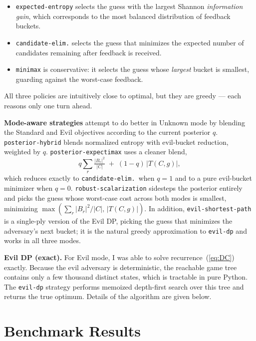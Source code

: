 \documentclass[11pt]{article}
\newcommand{\evilT}{T}
\begin{document}
\begin{itemize}
\item \texttt{expected-entropy} selects the guess with the largest
Shannon \emph{information gain}, which corresponds to the most
balanced distribution of feedback buckets.
\item \texttt{candidate-elim.} selects the guess that minimizes the
expected number of candidates remaining after feedback is received.
\item \texttt{minimax} is conservative: it selects the guess whose
\emph{largest} bucket is smallest, guarding against the worst-case
feedback.
\end{itemize}

All three policies are intuitively close to optimal, but they are
greedy --- each reasons only one turn ahead.

\textbf{Mode-aware strategies} attempt to do better in Unknown mode by
blending the Standard and Evil objectives according to the current
posterior $q$. \texttt{posterior-hybrid} blends normalized entropy
with evil-bucket reduction, weighted by $q$.
\texttt{posterior-expectimax} uses a cleaner blend,
\[
  q\sum_r \tfrac{|B_r|^2}{|C|} \;+\; (1-q)\,|\evilT(C, g)|,
\]
which reduces exactly to \texttt{candidate-elim.}\ when $q = 1$ and to
a pure evil-bucket minimizer when $q = 0$.
\texttt{robust-scalarization} sidesteps the posterior entirely and
picks the guess whose worst-case cost across both modes is smallest,
minimizing $\max(\sum_r |B_r|^2 / |C|, \,|\evilT(C, g)|)$. In addition,
\texttt{evil-shortest-path} is a single-ply version of the Evil DP,
picking the guess that minimizes the adversary's next bucket; it is
the natural greedy approximation to \texttt{evil-dp} and works in all
three modes.

\textbf{Evil DP (exact).} For Evil mode, I was able to solve
recurrence~(\ref{eq:DC}) exactly. Because the evil adversary is
deterministic, the reachable game tree contains only a few thousand
distinct states, which is tractable in pure Python. The
\texttt{evil-dp} strategy performs memoized depth-first search over
this tree and returns the true optimum. Details of the algorithm are
given below.

\section*{Benchmark Results}
\end{document}
